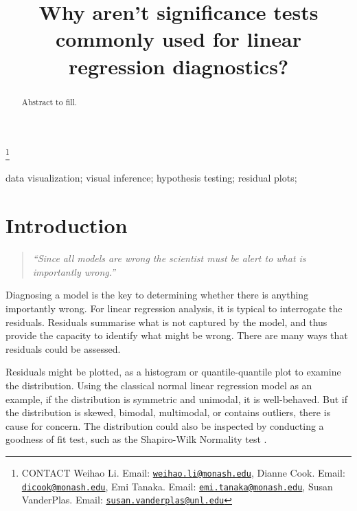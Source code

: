 \documentclass[]{interact}
\theoremstyle{plain}%
\theoremstyle{definition}
\theoremstyle{remark}
\begin{document}

\title{Why aren't significance tests commonly used for linear regression
diagnostics?}


\author{
}

\thanks{CONTACT Weihao
Li. Email: \href{mailto:weihao.li@monash.edu}{\nolinkurl{weihao.li@monash.edu}}, Dianne
Cook. Email: \href{mailto:dicook@monash.edu}{\nolinkurl{dicook@monash.edu}}, Emi
Tanaka. Email: \href{mailto:emi.tanaka@monash.edu}{\nolinkurl{emi.tanaka@monash.edu}}, Susan
VanderPlas. Email: \href{mailto:susan.vanderplas@unl.edu}{\nolinkurl{susan.vanderplas@unl.edu}}}

\maketitle

\begin{abstract}
Abstract to fill.
\end{abstract}

\begin{keywords}
data visualization; visual inference; hypothesis testing; residual
plots;
\end{keywords}

\hypertarget{introduction}{%
\section{Introduction}\label{introduction}}

\begin{quote}
\emph{``Since all models are wrong the scientist must be alert to what
is importantly wrong.''} \citep{box1976science}
\end{quote}

Diagnosing a model is the key to determining whether there is anything
importantly wrong. For linear regression analysis, it is typical to
interrogate the residuals. Residuals summarise what is not captured by
the model, and thus provide the capacity to identify what might be
wrong. There are many ways that residuals could be assessed.

Residuals might be plotted, as a histogram or quantile-quantile plot to
examine the distribution. Using the classical normal linear regression
model as an example, if the distribution is symmetric and unimodal, it
is well-behaved. But if the distribution is skewed, bimodal, multimodal,
or contains outliers, there is cause for concern. The distribution could
also be inspected by conducting a goodness of fit test, such as the
Shapiro-Wilk Normality test \citep{shapiro1965analysis}.
\end{document}
